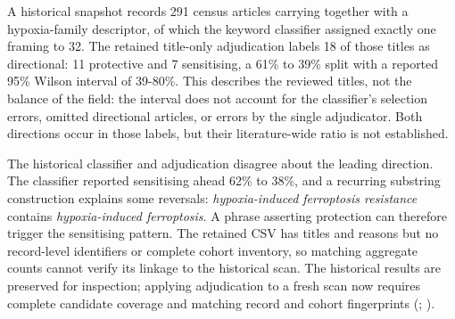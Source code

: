 \documentclass[11pt,twoside,openright]{report}
\begin{document}
A historical snapshot records 291 census articles carrying  together with a hypoxia-family descriptor, of which the keyword classifier assigned exactly one framing to 32. The retained title-only adjudication labels 18 of those titles as directional: 11 protective and 7 sensitising, a 61\% to 39\% split with a reported 95\% Wilson interval of 39-80\%. This describes the reviewed titles, not the balance of the field: the interval does not account for the classifier's selection errors, omitted directional articles, or errors by the single adjudicator. Both directions occur in those labels, but their literature-wide ratio is not established.

The historical classifier and adjudication disagree about the leading direction. The classifier reported sensitising ahead 62\% to 38\%, and a recurring substring construction explains some reversals: \textit{hypoxia-induced ferroptosis resistance} contains \textit{hypoxia-induced ferroptosis}. A phrase asserting protection can therefore trigger the sensitising pattern. The retained CSV has titles and reasons but no record-level identifiers or complete cohort inventory, so matching aggregate counts cannot verify its linkage to the historical scan. The historical results are preserved for inspection; applying adjudication to a fresh scan now requires complete candidate coverage and matching record and cohort fingerprints (; ).
\end{document}
